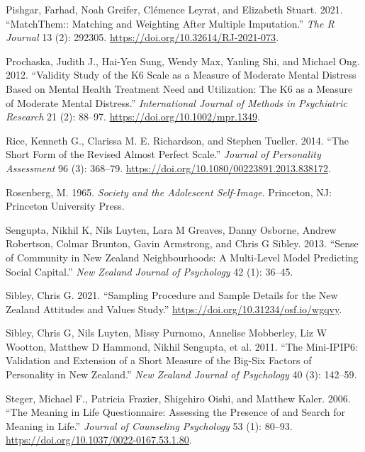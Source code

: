 \documentclass[
  singlecolumn]{report}
\newlength{\cslhangindent}
\newlength{\cslentryspacingunit} %
\newenvironment{CSLReferences}[2] %
 {%
  \setlength{\parindent}{0pt}
  \ifodd #1
  \let\oldpar\par
  \def\par{\hangindent=\cslhangindent\oldpar}
  \fi
  \setlength{\parskip}{#2\cslentryspacingunit}
 }%
 {}
\begin{document}
\begin{CSLReferences}{1}{0}
\leavevmode{}%
Pishgar, Farhad, Noah Greifer, Clémence Leyrat, and Elizabeth Stuart.
2021. {``MatchThem:: Matching and Weighting After Multiple
Imputation.''} \emph{The R Journal} 13 (2): 292305.
\url{https://doi.org/10.32614/RJ-2021-073}.

\leavevmode{}%
Prochaska, Judith J., Hai-Yen Sung, Wendy Max, Yanling Shi, and Michael
Ong. 2012. {``Validity Study of the K6 Scale as a Measure of Moderate
Mental Distress Based on Mental Health Treatment Need and Utilization:
The K6 as a Measure of Moderate Mental Distress.''} \emph{International
Journal of Methods in Psychiatric Research} 21 (2): 88--97.
\url{https://doi.org/10.1002/mpr.1349}.

\leavevmode{}%
Rice, Kenneth G., Clarissa M. E. Richardson, and Stephen Tueller. 2014.
{``The Short Form of the Revised Almost Perfect Scale.''} \emph{Journal
of Personality Assessment} 96 (3): 368--79.
\url{https://doi.org/10.1080/00223891.2013.838172}.

\leavevmode{}%
Rosenberg, M. 1965. \emph{Society and the Adolescent Self-Image}.
Princeton, NJ: Princeton University Press.

\leavevmode{}%
Sengupta, Nikhil K, Nils Luyten, Lara M Greaves, Danny Osborne, Andrew
Robertson, Colmar Brunton, Gavin Armstrong, and Chris G Sibley. 2013.
{``Sense of Community in New Zealand Neighbourhoods: A Multi-Level Model
Predicting Social Capital.''} \emph{New Zealand Journal of Psychology}
42 (1): 36--45.

\leavevmode{}%
Sibley, Chris G. 2021. {``Sampling Procedure and Sample Details for the
New Zealand Attitudes and Values Study.''}
\url{https://doi.org/10.31234/osf.io/wgqvy}.

\leavevmode{}%
Sibley, Chris G, Nils Luyten, Missy Purnomo, Annelise Mobberley, Liz W
Wootton, Matthew D Hammond, Nikhil Sengupta, et al. 2011. {``The
Mini-IPIP6: Validation and Extension of a Short Measure of the Big-Six
Factors of Personality in New Zealand.''} \emph{New Zealand Journal of
Psychology} 40 (3): 142--59.

\leavevmode{}%
Steger, Michael F., Patricia Frazier, Shigehiro Oishi, and Matthew
Kaler. 2006. {``The Meaning in Life Questionnaire: Assessing the
Presence of and Search for Meaning in Life.''} \emph{Journal of
Counseling Psychology} 53 (1): 80--93.
\url{https://doi.org/10.1037/0022-0167.53.1.80}.


\end{CSLReferences}
\end{document}
